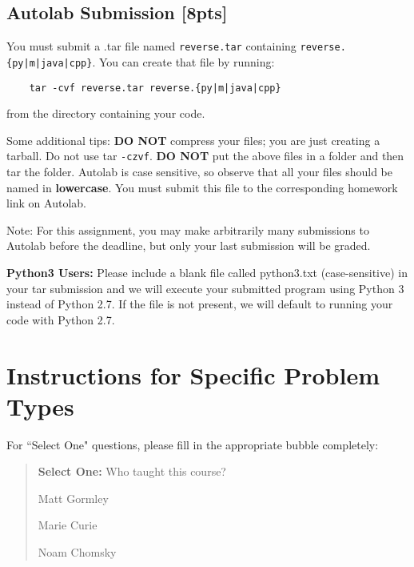 \documentclass[12pt]{article}
\begin{document}
\subsection{Autolab Submission [8pts]}

You must submit a .tar file named \texttt{reverse.tar} containing \texttt{reverse.\{py|m|java|cpp\}}. You can create that file by running:
\begin{verbatim}    tar -cvf reverse.tar reverse.{py|m|java|cpp}\end{verbatim}

from the directory containing your code.

Some additional tips: \textbf{DO NOT} compress your files; you are just creating a tarball. Do not use tar \texttt{-czvf}. \textbf{DO NOT} put the above files in a folder and then tar the folder. Autolab is case sensitive, so observe that all your files should be named in \textbf{lowercase}. You must submit this file to the corresponding homework link on Autolab.

Note: For this assignment, you may make arbitrarily many submissions to Autolab before the deadline, but only your last submission will be graded.


 \begin{notebox}
  {\bf Python3 Users:} Please include a blank file called python3.txt (case-sensitive) in your tar submission and we will execute your submitted program using Python 3 instead of Python 2.7. If the file is not present, we will default to running your code with Python 2.7.
 \end{notebox}


\clearpage

\section*{Instructions for Specific Problem Types}

For ``Select One" questions, please fill in the appropriate bubble completely:

\begin{quote}
\textbf{Select One:} Who taught this course?
\begin{list}{}
     \item\CIRCLE{} Matt Gormley
     \item\Circle{} Marie Curie
     \item\Circle{} Noam Chomsky
\end{list}
\end{quote}
\end{document}
